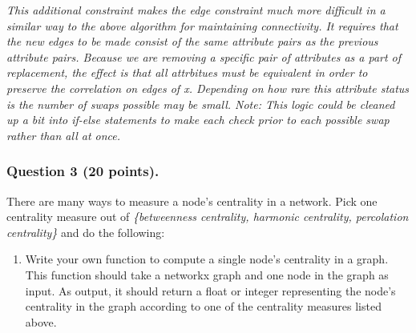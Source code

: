 \documentclass[11pt]{article}
\providecommand{\tightlist}{%
      \setlength{\itemsep}{0pt}\setlength{\parskip}{0pt}}
\begin{document}
\emph{This additional constraint makes the edge constraint much more
difficult in a similar way to the above algorithm for maintaining
connectivity. It requires that the new edges to be made consist of the
same attribute pairs as the previous attribute pairs. Because we are
removing a specific pair of attributes as a part of replacement, the
effect is that all attrbitues must be equivalent in order to preserve
the correlation on edges of x. Depending on how rare this attribute
status is the number of swaps possible may be small. Note: This logic
could be cleaned up a bit into if-else statements to make each check
prior to each possible swap rather than all at once.}

    \subsubsection{\texorpdfstring{\textbf{Question 3 (20
points).}}{Question 3 (20 points).}}\label{question-3-20-points.}

There are many ways to measure a node's centrality in a network. Pick
one centrality measure out of \emph{\{betweenness centrality, harmonic
centrality, percolation centrality\}} and do the following:

    \begin{enumerate}
\def\labelenumi{(\alph{enumi})}
\tightlist
\item
  Write your own function to compute a single node's centrality in a
  graph. This function should take a networkx graph and one node in the
  graph as input. As output, it should return a float or integer
  representing the node's centrality in the graph according to one of
  the centrality measures listed above.
\end{enumerate}
\end{document}
